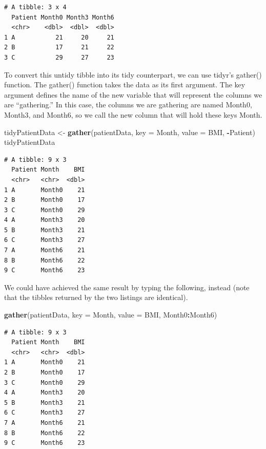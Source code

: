 \documentclass[
]{article}
\newenvironment{Shaded}{\begin{snugshade}}{\end{snugshade}}
\newcommand{\AttributeTok}[1]{\textcolor[rgb]{0.13,0.29,0.53}{#1}}
\newcommand{\FunctionTok}[1]{\textcolor[rgb]{0.13,0.29,0.53}{\textbf{#1}}}
\newcommand{\NormalTok}[1]{#1}
\newcommand{\OtherTok}[1]{\textcolor[rgb]{0.56,0.35,0.01}{#1}}
\newcommand{\SpecialCharTok}[1]{\textcolor[rgb]{0.81,0.36,0.00}{\textbf{#1}}}
\begin{document}
\begin{verbatim}
# A tibble: 3 x 4
  Patient Month0 Month3 Month6
  <chr>    <dbl>  <dbl>  <dbl>
1 A           21     20     21
2 B           17     21     22
3 C           29     27     23
\end{verbatim}

To convert this untidy tibble into its tidy counterpart, we can use
tidyr's gather() function. The gather() function takes the data as its
first argument. The key argument defines the name of the new variable
that will represent the columns we are ``gathering.'' In this case, the
columns we are gathering are named Month0, Month3, and Month6, so we
call the new column that will hold these keys Month.

\begin{Shaded}
\begin{Highlighting}[]
\NormalTok{tidyPatientData }\OtherTok{\textless{}{-}} \FunctionTok{gather}\NormalTok{(patientData, }\AttributeTok{key =}\NormalTok{ Month, }
                          \AttributeTok{value =}\NormalTok{ BMI, }\SpecialCharTok{{-}}\NormalTok{Patient)}
\NormalTok{tidyPatientData}
\end{Highlighting}
\end{Shaded}

\begin{verbatim}
# A tibble: 9 x 3
  Patient Month    BMI
  <chr>   <chr>  <dbl>
1 A       Month0    21
2 B       Month0    17
3 C       Month0    29
4 A       Month3    20
5 B       Month3    21
6 C       Month3    27
7 A       Month6    21
8 B       Month6    22
9 C       Month6    23
\end{verbatim}

We could have achieved the same result by typing the following, instead
(note that the tibbles returned by the two listings are identical).

\begin{Shaded}
\begin{Highlighting}[]
\FunctionTok{gather}\NormalTok{(patientData, }\AttributeTok{key =}\NormalTok{ Month, }\AttributeTok{value =}\NormalTok{ BMI, Month0}\SpecialCharTok{:}\NormalTok{Month6)}
\end{Highlighting}
\end{Shaded}

\begin{verbatim}
# A tibble: 9 x 3
  Patient Month    BMI
  <chr>   <chr>  <dbl>
1 A       Month0    21
2 B       Month0    17
3 C       Month0    29
4 A       Month3    20
5 B       Month3    21
6 C       Month3    27
7 A       Month6    21
8 B       Month6    22
9 C       Month6    23
\end{verbatim}
\end{document}
